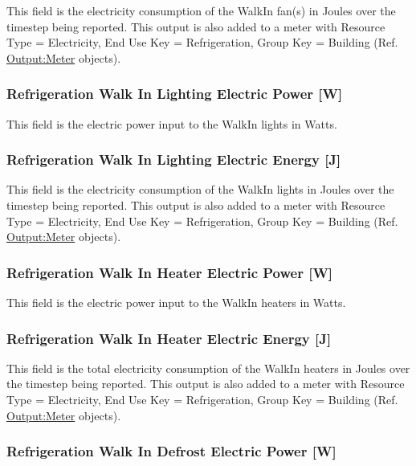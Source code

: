 This field is the electricity consumption of the WalkIn fan(s) in Joules over the timestep being reported. This output is also added to a meter with Resource Type = Electricity, End Use Key = Refrigeration, Group Key = Building (Ref. \hyperref[outputmeter-and-outputmetermeterfileonly]{Output:Meter} objects).

\subsubsection{Refrigeration Walk In Lighting Electric Power {[}W{]}}\label{refrigeration-walk-in-lighting-electric-power-w}

This field is the electric power input to the WalkIn lights in Watts.

\subsubsection{Refrigeration Walk In Lighting Electric Energy {[}J{]}}\label{refrigeration-walk-in-lighting-electric-energy-j}

This field is the electricity consumption of the WalkIn lights in Joules over the timestep being reported. This output is also added to a meter with Resource Type = Electricity, End Use Key = Refrigeration, Group Key = Building (Ref. \hyperref[outputmeter-and-outputmetermeterfileonly]{Output:Meter} objects).

\subsubsection{Refrigeration Walk In Heater Electric Power {[}W{]}}\label{refrigeration-walk-in-heater-electric-power-w}

This field is the electric power input to the WalkIn heaters in Watts.

\subsubsection{Refrigeration Walk In Heater Electric Energy {[}J{]}}\label{refrigeration-walk-in-heater-electric-energy-j}

This field is the total electricity consumption of the WalkIn heaters in Joules over the timestep being reported. This output is also added to a meter with Resource Type = Electricity, End Use Key = Refrigeration, Group Key = Building (Ref. \hyperref[outputmeter-and-outputmetermeterfileonly]{Output:Meter} objects).

\subsubsection{Refrigeration Walk In Defrost Electric Power {[}W{]}}\label{refrigeration-walk-in-defrost-electric-power-w}

